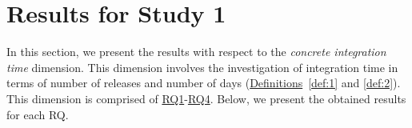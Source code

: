 \section{Results for Study 1}\label{ch4:study1} 

In this section, we present the results with respect to the \textit{concrete
integration time} dimension. This dimension involves the investigation of
integration time in terms of number of releases and number of days
(\hyperref[def:1]{Definitions}~\ref{def:1} and \ref{def:2}). This dimension is
comprised of \hyperref[ch4:rq1]{RQ1}-\hyperref[ch4:rq4]{RQ4}. Below, we present the
obtained results for each RQ. 






